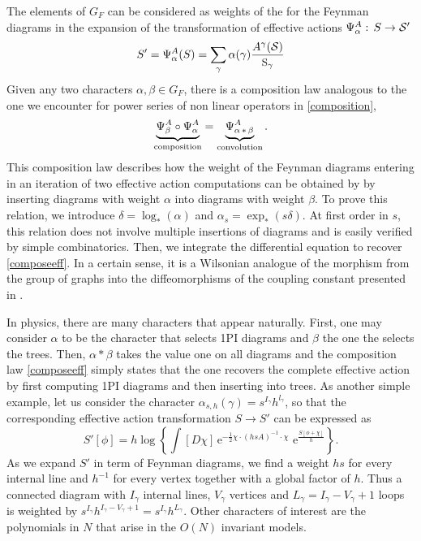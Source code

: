 \documentclass[10pt,here,feynmf]{article}
\begin{document}
The elements of $G_{F}$ can be considered as weights of the for the Feynman diagrams in the expansion of the transformation of effective actions $\Psi^{A}_{\alpha}:\,S\rightarrow{\cal
S}'$
\begin{equation}
S'=\Psi^{A}_{\alpha}(S)=\sum_{\gamma}\alpha(\gamma)\frac{A^{\gamma}({\cal
S})}{{\mbox{{\small S}}_{\gamma}}}
\end{equation}
Given any two characters $\alpha,\beta\in G_{F}$, there is a composition law analogous to the one we encounter for power series of non linear operators in \eqref{composition},
\begin{equation}
\underbrace{\Psi^{A}_{\beta}\circ\Psi^{A}_{\alpha}}_{\mbox{\scriptsize
composition}}=
\underbrace{\Psi^{A}_{\alpha\,\ast\,\beta}}_{\mbox{\scriptsize
convolution}}.
\label{composeeff}
\end{equation}
This composition law describes how the weight of the Feynman diagrams entering in an iteration of two  effective action computations can be obtained by by inserting diagrams with weight $\alpha$ into diagrams with weight $\beta$. To prove this relation, we introduce $\delta=\log_{\ast}(\alpha)$ and $\alpha_{s}=\exp_{\ast}(s\delta)$. At first order in $s$, this relation does not involve multiple insertions of diagrams and is easily verified by simple combinatorics. Then, we integrate the differential equation to recover \eqref{composeeff}. In a certain sense, it is a Wilsonian analogue of the morphism from the group of graphs into the diffeomorphisms of the coupling constant presented in \cite{ck2}. 

In physics, there are many characters  that appear naturally. First, one may consider $\alpha$ to be the character that selects 1PI diagrams and $\beta$ the one the selects the trees. Then, $\alpha\ast\beta$ takes the value one on all diagrams and the composition law \eqref{composeeff} simply states that the one recovers the complete effective action by first computing 1PI diagrams and then inserting into trees. As another simple example, let us consider the character $\alpha_{s,h}(\gamma)=s^{I_{\gamma}}h^{l_{\gamma}}$, so that the corresponding effective action transformation $S\rightarrow S'$ can be expressed as
\begin{equation}
S'[\phi]=h\log\left\{
\int[D\chi]\,\mathrm{e}^{-\frac{1}{2}\chi\cdot (hsA)^{-1}\cdot \chi}\,
\,\mathrm{e}^{\frac{S[\phi+\chi]}{h}}
\right\}.
\label{loopeff}
\end{equation} 
As we expand $S'$ in term of Feynman diagrams, we find a weight $hs$ for every internal line and $h^{-1}$ for every vertex together with a global factor of $h$. Thus a connected diagram with $I_{\gamma}$ internal lines, $V_{\gamma}$ vertices and $L_{\gamma}=I_{\gamma}-V_{\gamma}+1$ loops is weighted by $s^{I_{\gamma}}h^{I_{\gamma}-V_{\gamma}+1}=s^{I_{\gamma}}h^{L_{\gamma}}.$ 
Other characters of interest are the polynomials in $N$ that arise in the $O(N)$ invariant models.
\end{document}
